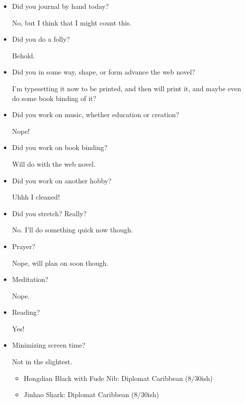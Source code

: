 \documentclass[12pt]{article}
\renewcommand{\,}{\textsuperscript{,}}
\begin{document}
\begin{itemize}

\item Did you journal by hand today?

No, but I think that I might count this.

\item Did you do a folly?

Behold.

\item Did you in some way, shape, or form advance the web novel?

I'm typesetting it now to be printed, and then will print it, and maybe even do some book binding of it?

\item Did you work on music, whether education or creation?

Nope!

\item Did you work on book binding?

Will do with the web novel.

\item Did you work on another hobby?

Uhhh I cleaned!

\item Did you stretch? Really?

No. I'll do something quick now though.

\item Prayer?

Nope, will plan on soon though.

\item Meditation?

Nope.

\item Reading?

Yes!

\item Minimizing screen time?

Not in the slightest.

\begin{itemize}  
\item Hongdian Black with Fude Nib: Diplomat Caribbean (8/30ish)  
\item Jinhao Shark: Diplomat Caribbean (8/30ish)

\end{itemize}

\end{itemize}
\end{document}
